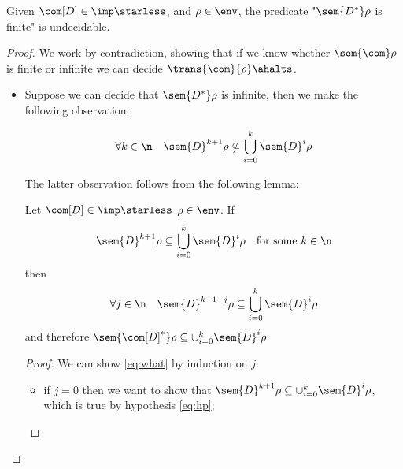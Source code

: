 \begin{lemma}\label{le:infiniteness}
  Given \(\com[D]\in\imp\starless\), and \(\rho \in \env\), the
  predicate "\(\sem{D^*}\rho\) is finite" is undecidable.
\end{lemma}

\begin{proof}
  We work by contradiction, showing that if we know whether
  \(\sem{\com}\rho\) is finite or infinite we can decide
  \(\trans{\com}{\rho}\ahalts\).
  \begin{itemize}
  \item Suppose we can decide that \(\sem{D^*}\rho\) is infinite, then
    we make the following observation:
    \begin{observation}\label{obs:noncontained}
      \begin{equation*}
        \forall k \in \n \quad \sem{D}^{k+1}\rho \nsubseteq \bigcup_{i=0}^k\sem{D}^i\rho
      \end{equation*} 
    \end{observation}
    The latter observation follows from the following lemma:
    \begin{lemma}\label{le:contain}
      Let \(\com[D] \in \imp\starless\) \(\rho \in \env\). If
      \begin{equation}\label{eq:hp}
        \sem{D}^{k+1}\rho \subseteq \bigcup_{i=0}^k\sem{D}^i\rho \quad \text{for some } k \in \n
      \end{equation}
      then
      \begin{equation}\label{eq:what}
        \forall j \in \n \quad \sem{D}^{k+1+j}\rho \subseteq \bigcup_{i=0}^k\sem{D}^i\rho
      \end{equation}
      and therefore
      \(\sem{\com[D]^*}\rho \subseteq \cup_{i=0}^k\sem{D}^i\rho\)
    \end{lemma}
    \begin{proof}
      We can show \eqref{eq:what} by induction on \(j\):
      \begin{itemize}
      \item if \(j=0\) then we want to show that
        \(\sem{D}^{k+1}\rho \subseteq \cup_{i=0}^k\sem{D}^i\rho\), which is
        true by hypothesis \eqref{eq:hp};
        

\end{itemize}
\end{proof}
\end{itemize}
\end{proof}
